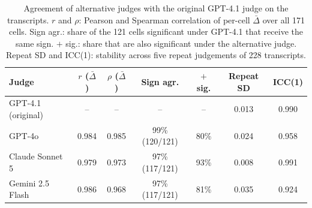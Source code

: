 \begin{table}[h]
\centering
\caption{Agreement of alternative judges with the original GPT-4.1 judge on the  transcripts. $r$ and $\rho$: Pearson and Spearman correlation of per-cell $\bar\Delta$ over all 171 cells. Sign agr.: share of the 121 cells significant under GPT-4.1 that receive the same sign. $+$ sig.: share that are also significant under the alternative judge. Repeat SD and ICC(1): stability across five repeat judgements of 228 transcripts.}
\label{tab:judge-robustness}
\small
\begin{tabular}{lcccccc}
\toprule
Judge & $r$ ($\bar\Delta$) & $\rho$ ($\bar\Delta$) & Sign agr. & $+$ sig. & Repeat SD & ICC(1) \\
\midrule
GPT-4.1 (original) & -- & -- & -- & -- & 0.013 & 0.990 \\
GPT-4o & 0.984 & 0.985 & 99\% (120/121) & 80\% & 0.024 & 0.958 \\
Claude Sonnet 5 & 0.979 & 0.973 & 97\% (117/121) & 93\% & 0.008 & 0.991 \\
Gemini 2.5 Flash & 0.986 & 0.968 & 97\% (117/121) & 81\% & 0.035 & 0.924 \\
\bottomrule
\end{tabular}
\end{table}
